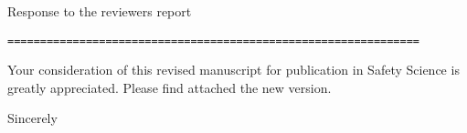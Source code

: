 \documentclass[a4paper,12pt]{letter}
\begin{document}
\begin{letter}{Response to the reviewers report}
{\begin{verbatim}
===============================================================
\end{verbatim}

}

Your consideration of this revised manuscript for publication in 
Safety Science is greatly appreciated. 
Please find attached the new version. \\

\closing{Sincerely}




\end{letter}
\end{document}
